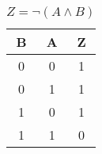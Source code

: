 
\begin{center}
    \begin{table}[h] \caption{\(Z = \neg (A \land B) \)}
        \begin{tabular}{|c|c||c|} \hline
            B & A & Z \\ \hline\hline
            0 & 0 & 1 \\ \hline
            0 & 1 & 1 \\ \hline
            1 & 0 & 1 \\ \hline
            1 & 1 & 0 \\ \hline
        \end{tabular}
    \end{table}
\end{center}
